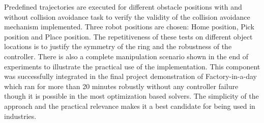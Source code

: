 Predefined trajectories are executed for different obstacle positions with and without collision avoidance task to verify the validity of the collision avoidance mechanism implemented. Three robot positions are chosen: Home position, Pick position and Place position. The repetitiveness of these tests on different object locations is to justify the symmetry of the ring and the robustness of the controller. There is also a complete manipulation scenario shown in the end of experiments to illustrate the practical use of the implementation. This component was successfully integrated in the final project demonstration of Factory-in-a-day which ran for more than 20 minutes robustly without any controller failure though it is possible in the most optimization based solvers. The simplicity of the approach and the practical relevance makes it a best candidate for being used in industries. 
